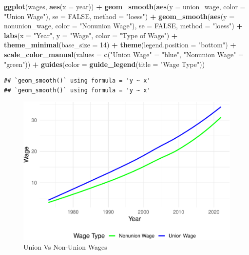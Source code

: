 \documentclass[
]{book}
\newenvironment{Shaded}{\begin{snugshade}}{\end{snugshade}}
\newcommand{\AttributeTok}[1]{\textcolor[rgb]{0.13,0.29,0.53}{#1}}
\newcommand{\ConstantTok}[1]{\textcolor[rgb]{0.56,0.35,0.01}{#1}}
\newcommand{\DecValTok}[1]{\textcolor[rgb]{0.00,0.00,0.81}{#1}}
\newcommand{\FunctionTok}[1]{\textcolor[rgb]{0.13,0.29,0.53}{\textbf{#1}}}
\newcommand{\NormalTok}[1]{#1}
\newcommand{\OtherTok}[1]{\textcolor[rgb]{0.56,0.35,0.01}{#1}}
\newcommand{\SpecialCharTok}[1]{\textcolor[rgb]{0.81,0.36,0.00}{\textbf{#1}}}
\newcommand{\StringTok}[1]{\textcolor[rgb]{0.31,0.60,0.02}{#1}}
\theoremstyle{definition}
\theoremstyle{definition}
\theoremstyle{definition}
\theoremstyle{definition}
\theoremstyle{remark}
\begin{document}
\begin{Shaded}
\begin{Highlighting}[]
\FunctionTok{ggplot}\NormalTok{(wages, }\FunctionTok{aes}\NormalTok{(}\AttributeTok{x =}\NormalTok{ year)) }\SpecialCharTok{+}
  \FunctionTok{geom\_smooth}\NormalTok{(}\FunctionTok{aes}\NormalTok{(}\AttributeTok{y =}\NormalTok{ union\_wage, }\AttributeTok{color =} \StringTok{"Union Wage"}\NormalTok{), }
              \AttributeTok{se =} \ConstantTok{FALSE}\NormalTok{, }\AttributeTok{method =} \StringTok{"loess"}\NormalTok{) }\SpecialCharTok{+}
  \FunctionTok{geom\_smooth}\NormalTok{(}\FunctionTok{aes}\NormalTok{(}\AttributeTok{y =}\NormalTok{ nonunion\_wage, }\AttributeTok{color =} \StringTok{"Nonunion Wage"}\NormalTok{), }
              \AttributeTok{se =} \ConstantTok{FALSE}\NormalTok{, }\AttributeTok{method =} \StringTok{"loess"}\NormalTok{) }\SpecialCharTok{+}
  \FunctionTok{labs}\NormalTok{(}\AttributeTok{x =} \StringTok{"Year"}\NormalTok{, }\AttributeTok{y =} \StringTok{"Wage"}\NormalTok{,}
       \AttributeTok{color =} \StringTok{"Type of Wage"}\NormalTok{) }\SpecialCharTok{+}
  \FunctionTok{theme\_minimal}\NormalTok{(}\AttributeTok{base\_size =} \DecValTok{14}\NormalTok{) }\SpecialCharTok{+}
  \FunctionTok{theme}\NormalTok{(}\AttributeTok{legend.position =} \StringTok{"bottom"}\NormalTok{) }\SpecialCharTok{+}
  \FunctionTok{scale\_color\_manual}\NormalTok{(}\AttributeTok{values =} \FunctionTok{c}\NormalTok{(}\StringTok{"Union Wage"} \OtherTok{=} \StringTok{"blue"}\NormalTok{, }\StringTok{"Nonunion Wage"} \OtherTok{=} \StringTok{"green"}\NormalTok{)) }\SpecialCharTok{+}
  \FunctionTok{guides}\NormalTok{(}\AttributeTok{color =} \FunctionTok{guide\_legend}\NormalTok{(}\AttributeTok{title =} \StringTok{"Wage Type"}\NormalTok{))}
\end{Highlighting}
\end{Shaded}

\begin{verbatim}
## `geom_smooth()` using formula = 'y ~ x'
## `geom_smooth()` using formula = 'y ~ x'
\end{verbatim}

\begin{figure}
\centering
\includegraphics{_main_files/figure-latex/wagecomparison-1.pdf}
\caption{\label{fig:wagecomparison}Union Vs Non-Union Wages}
\end{figure}
\end{document}
